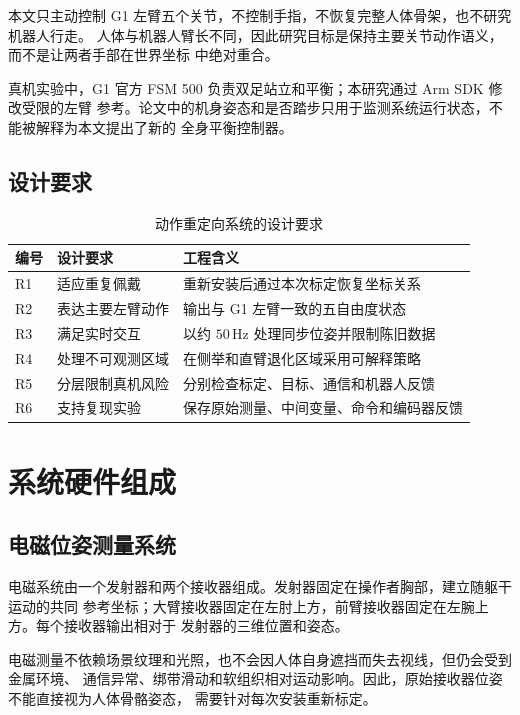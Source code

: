 本文只主动控制 G1 左臂五个关节，不控制手指，不恢复完整人体骨架，也不研究机器人行走。
人体与机器人臂长不同，因此研究目标是保持主要关节动作语义，而不是让两者手部在世界坐标
中绝对重合。

真机实验中，G1 官方 FSM 500 负责双足站立和平衡；本研究通过 Arm SDK 修改受限的左臂
参考。论文中的机身姿态和是否踏步只用于监测系统运行状态，不能被解释为本文提出了新的
全身平衡控制器。

\subsection{设计要求}
\label{subsec:ch3_design_requirements}

\begin{table}[htbp]
  \centering
  \caption{动作重定向系统的设计要求}
  \label{tab:ch3_design_requirements}
  \begin{tabularx}{\linewidth}{@{}lXX@{}}
    \toprule
    编号 & 设计要求 & 工程含义 \\
    \midrule
    R1 & 适应重复佩戴 & 重新安装后通过本次标定恢复坐标关系 \\
    R2 & 表达主要左臂动作 & 输出与 G1 左臂一致的五自由度状态 \\
    R3 & 满足实时交互 & 以约 $50\,\mathrm{Hz}$ 处理同步位姿并限制陈旧数据 \\
    R4 & 处理不可观测区域 & 在侧举和直臂退化区域采用可解释策略 \\
    R5 & 分层限制真机风险 & 分别检查标定、目标、通信和机器人反馈 \\
    R6 & 支持复现实验 & 保存原始测量、中间变量、命令和编码器反馈 \\
    \bottomrule
  \end{tabularx}
\end{table}

\section{系统硬件组成}
\label{sec:ch3_hardware}

\subsection{电磁位姿测量系统}
\label{subsec:ch3_em_system}

电磁系统由一个发射器和两个接收器组成。发射器固定在操作者胸部，建立随躯干运动的共同
参考坐标；大臂接收器固定在左肘上方，前臂接收器固定在左腕上方。每个接收器输出相对于
发射器的三维位置和姿态。

电磁测量不依赖场景纹理和光照，也不会因人体自身遮挡而失去视线，但仍会受到金属环境、
通信异常、绑带滑动和软组织相对运动影响。因此，原始接收器位姿不能直接视为人体骨骼姿态，
需要针对每次安装重新标定。

